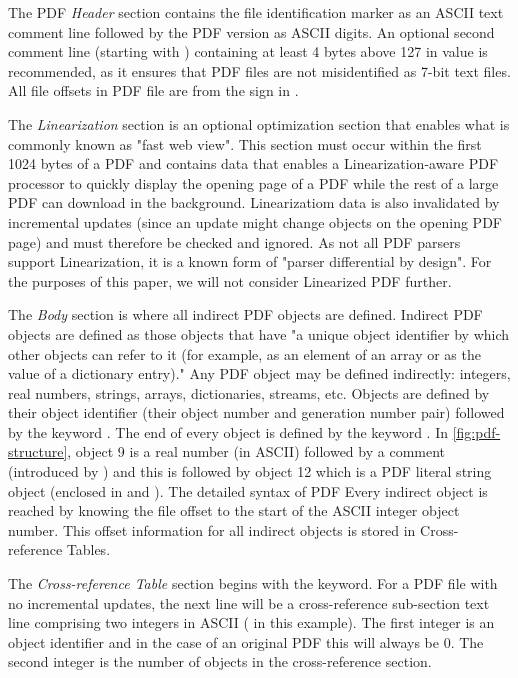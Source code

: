 The PDF \emph{Header} section contains the file identification marker as an ASCII
text comment line  followed by the PDF version as ASCII digits. 
An optional second comment line (starting with \lstcd{\%})
containing at least 4 bytes above 127 in value is recommended, as it ensures 
that PDF files are not misidentified as 7-bit text files. 
All file offsets in PDF file are from the \lstcd{\%} sign in .  

The \emph{Linearization} section is an optional optimization section that enables what is commonly
known as "fast web view". This section must occur within the first 1024 bytes of a PDF and contains
data that enables a Linearization-aware PDF processor to quickly display the opening page of a PDF
while the rest of a large PDF can download in the background.
Linearizatiom data is also invalidated by incremental updates (since an update might change objects
on the opening PDF page) and must therefore be checked and ignored.
As not all PDF parsers support Linearization, it is a known form of "parser differential by design". 
For the purposes of this paper, we will not consider Linearized PDF further.

The \emph{Body} section is where all indirect PDF objects are defined. Indirect PDF objects
are defined as those objects that have "a unique object identifier by which other objects can
refer to it (for example, as an element of an array or as the value of a dictionary entry)."
Any PDF object may be defined indirectly: integers, real numbers, strings, arrays, dictionaries, 
streams, etc. Objects are defined by their object identifier (their object number and generation 
number pair) followed by the keyword . 
The end of every object is defined by the keyword .
In \cref{fig:pdf-structure}, object 9 is a real number (in ASCII) followed by a comment
(introduced by \lstcd{\%}) and this is followed by object 12 which is a PDF literal string object
(enclosed in \lstcd{(} and \lstcd{)}). The detailed syntax of PDF  
Every indirect object is reached by knowing the file offset to the start of the ASCII integer 
object number. This offset information for all indirect objects is stored in Cross-reference Tables.

The \emph{Cross-reference Table} section begins with the  keyword. For a PDF file
with no incremental updates, the next line will be a cross-reference sub-section text line comprising
two integers in ASCII ( in this example). The first integer is an object identifier 
and in the case of an original PDF this will always be 0. The second integer is the number of
objects in the cross-reference section.

